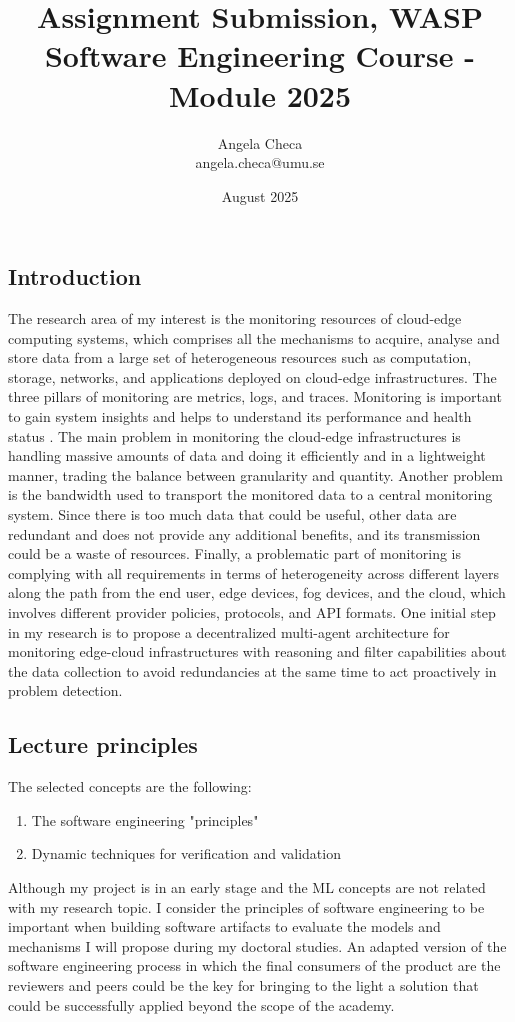 \documentclass[11pt,a4paper]{article}
\title{Assignment Submission, WASP Software Engineering Course - Module 2025}
\author{Angela Checa \\ {angela.checa@umu.se} }
\date{August 2025}
\begin{document}
\maketitle

\subsection*{Introduction}

The research area of my interest is the monitoring resources of cloud-edge computing systems, which comprises all the mechanisms to acquire, analyse and store data from a large set of heterogeneous resources such as computation, storage, networks, and applications deployed on cloud-edge infrastructures.  The three pillars of monitoring are metrics, logs, and traces. Monitoring is important to gain system insights and helps to understand its performance and health status \cite{Sikha2023}. The main problem in monitoring the cloud-edge infrastructures is handling massive amounts of data and doing it efficiently and in a lightweight manner, trading the balance between granularity and quantity. Another problem is the bandwidth used to transport the monitored data to a central monitoring system. Since there is too much data that could be useful, other data are redundant and does not provide any additional benefits, and its transmission could be a waste of resources. Finally, a problematic part of monitoring is complying with all requirements in terms of heterogeneity across different layers along the path from the end user, edge devices, fog devices, and the cloud, which involves different provider policies, protocols, and API formats. One initial step in my research is to propose a decentralized multi-agent architecture for monitoring edge-cloud infrastructures with reasoning and filter capabilities about the data collection to avoid redundancies at the same time to act proactively in problem detection. 

\subsection*{Lecture principles}
The selected concepts are the following:
\begin{enumerate}
    \item The software engineering "principles" 
    \item Dynamic techniques for verification and validation
\end{enumerate}

Although my project is in an early stage and the ML concepts are not related with my research topic. I consider the principles of software engineering to be important when building software artifacts to evaluate the models and mechanisms I will propose during my doctoral studies. An adapted version of the software engineering process in which the final consumers of the product are the reviewers and peers could be the key for bringing to the light a solution that could be successfully applied beyond the scope of the academy. 
\end{document}
